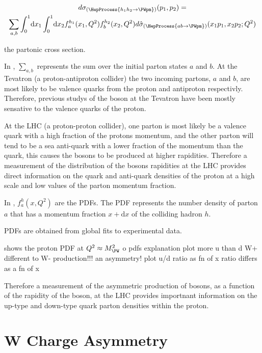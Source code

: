 \begin{multline}
  d\sigma_{(\HepProcess{h_1 h_2 \to \PWpm})}(p_1,p_2) = \\
  \sum\limits_{a,b}
  \int_0^1 \! \mathrm{d} x_1 
  \int_0^1 \! \mathrm{d} x_2 
  f_a^{h_1}(x_1,Q^2)
  f_b^{h_2}(x_2,Q^2) 
  d\hat{\sigma}_{(\HepProcess{a b \to \PWpm})}(x_1 p_1, x_2 p_2; Q^2)
  \label{wbos:xsec}
\end{multline}

the partonic cross section.

In , $\sum\limits_{a,b}$ represents the sum over the
initial parton states $a$ and $b$. At the Tevatron (a proton-antiproton
collider) the two incoming partons, $a$ and $b$, are most likely to be valence
quarks from the proton and antiproton respectivly. Therefore, previous studys
of the \PW boson at the Tevatron have been mostly sensative to the valence
quarks of the proton.

At the \ac{LHC} (a proton-proton collider), one parton is most likely be a
valence quark with a high fraction of the protons momentum, and the other
parton will tend to be a sea anti-quark with a lower fraction of the momentum
than the quark, this causes the \PW bosons to be produced at higher rapidities.
Therefore a measurement of the distribution of the \PW bosons rapidities at the
\ac{LHC} provides direct information on the quark and anti-quark densities of
the proton at a high scale and low values of the parton momentum fraction. 

In , $f_a^{h}(x,Q^2)$ are the \acp{PDF}.
The \ac{PDF} represents the number density of parton $a$ that has a momentum
fraction $x+\mathrm{d}x$ of the colliding hadron $h$.

\acp{PDF} are obtained from global fits to experimental data. %

 shows the proton PDF at $Q^2\approx M_{\PW}^2$ 
o
pdfs
 explanation
 plot
 more u than d
 W+ different to W- production!!!
 an asymmetry!
 plot u/d ratio as fn of x
 ratio differs as a fn of x
 
Therefore a measurement of the asymmetric production of \PW bosons, as a
function of the rapidity of the boson, at the \ac{LHC} provides importnant
information on the up-type and down-type quark parton densities within the
proton. 





\section{W Charge Asymmetry}

